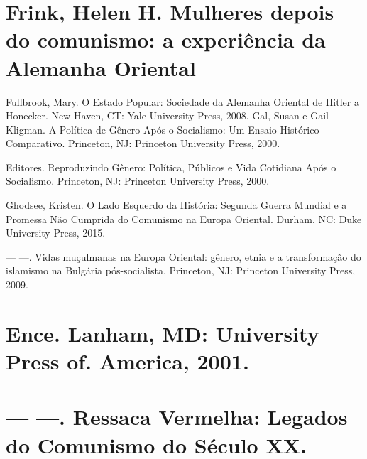 \section{Frink, Helen H. Mulheres depois do comunismo: a experiência da Alemanha Oriental}
 \par 
Fullbrook, Mary. O Estado Popular: Sociedade da Alemanha Oriental de Hitler a Honecker. New Haven, CT: Yale University Press, 2008. Gal, Susan e Gail Kligman. A Política de Gênero Após o Socialismo: Um Ensaio Histórico-Comparativo. Princeton, NJ: Princeton University Press, 2000.
 \par 
Editores. Reproduzindo Gênero: Política, Públicos e Vida Cotidiana Após o Socialismo. Princeton, NJ: Princeton University Press, 2000.
 \par 
Ghodsee, Kristen. O Lado Esquerdo da História: Segunda Guerra Mundial e a Promessa Não Cumprida do Comunismo na Europa Oriental. Durham, NC: Duke University Press, 2015.
 \par 
— —. Vidas muçulmanas na Europa Oriental: gênero, etnia e a transformação do islamismo na Bulgária pós-socialista, Princeton, NJ: Princeton University Press, 2009.
 \par 
\section{Ence. Lanham, MD: University Press of. America, 2001.}
 \par 
\section{— —. Ressaca Vermelha: Legados do Comunismo do Século XX.}
 \par 
